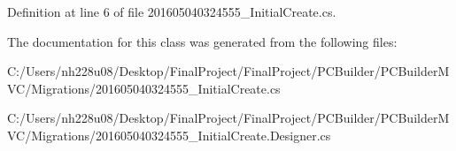 Definition at line 6 of file 201605040324555\+\_\+\+Initial\+Create.\+cs.



The documentation for this class was generated from the following files\+:\begin{DoxyCompactItemize}
\item 
C\+:/\+Users/nh228u08/\+Desktop/\+Final\+Project/\+Final\+Project/\+P\+C\+Builder/\+P\+C\+Builder\+M\+V\+C/\+Migrations/201605040324555\+\_\+\+Initial\+Create.\+cs\item 
C\+:/\+Users/nh228u08/\+Desktop/\+Final\+Project/\+Final\+Project/\+P\+C\+Builder/\+P\+C\+Builder\+M\+V\+C/\+Migrations/201605040324555\+\_\+\+Initial\+Create.\+Designer.\+cs\end{DoxyCompactItemize}
